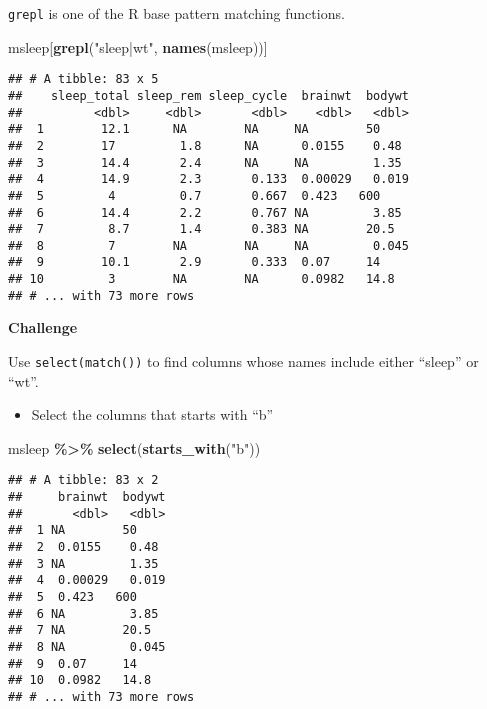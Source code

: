 \documentclass[
]{book}
\newenvironment{Shaded}{\begin{snugshade}}{\end{snugshade}}
\newcommand{\KeywordTok}[1]{\textcolor[rgb]{0.13,0.29,0.53}{\textbf{#1}}}
\newcommand{\NormalTok}[1]{#1}
\newcommand{\OperatorTok}[1]{\textcolor[rgb]{0.81,0.36,0.00}{\textbf{#1}}}
\newcommand{\StringTok}[1]{\textcolor[rgb]{0.31,0.60,0.02}{#1}}
\providecommand{\tightlist}{%
  \setlength{\itemsep}{0pt}\setlength{\parskip}{0pt}}
\begin{document}
\texttt{grepl} is one of the R base pattern matching functions.

\begin{Shaded}
\begin{Highlighting}[]
\NormalTok{msleep[}\KeywordTok{grepl}\NormalTok{(}\StringTok{"sleep|wt"}\NormalTok{, }\KeywordTok{names}\NormalTok{(msleep))]}
\end{Highlighting}
\end{Shaded}

\begin{verbatim}
## # A tibble: 83 x 5
##    sleep_total sleep_rem sleep_cycle  brainwt  bodywt
##          <dbl>     <dbl>       <dbl>    <dbl>   <dbl>
##  1        12.1      NA        NA     NA        50    
##  2        17         1.8      NA      0.0155    0.48 
##  3        14.4       2.4      NA     NA         1.35 
##  4        14.9       2.3       0.133  0.00029   0.019
##  5         4         0.7       0.667  0.423   600    
##  6        14.4       2.2       0.767 NA         3.85 
##  7         8.7       1.4       0.383 NA        20.5  
##  8         7        NA        NA     NA         0.045
##  9        10.1       2.9       0.333  0.07     14    
## 10         3        NA        NA      0.0982   14.8  
## # ... with 73 more rows
\end{verbatim}

\textbf{Challenge}

Use \texttt{select(match())} to find columns whose names include either ``sleep'' or ``wt''.

\begin{itemize}
\tightlist
\item
  Select the columns that starts with ``b''
\end{itemize}

\begin{Shaded}
\begin{Highlighting}[]
\NormalTok{msleep }\OperatorTok{\%\textgreater{}\%}
\StringTok{  }\KeywordTok{select}\NormalTok{(}\KeywordTok{starts\_with}\NormalTok{(}\StringTok{"b"}\NormalTok{))}
\end{Highlighting}
\end{Shaded}

\begin{verbatim}
## # A tibble: 83 x 2
##     brainwt  bodywt
##       <dbl>   <dbl>
##  1 NA        50    
##  2  0.0155    0.48 
##  3 NA         1.35 
##  4  0.00029   0.019
##  5  0.423   600    
##  6 NA         3.85 
##  7 NA        20.5  
##  8 NA         0.045
##  9  0.07     14    
## 10  0.0982   14.8  
## # ... with 73 more rows
\end{verbatim}
\end{document}
